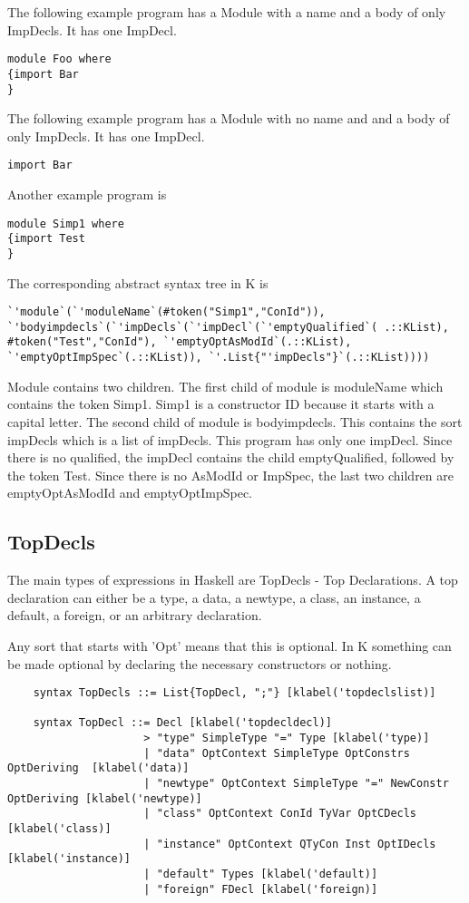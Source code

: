 The following example program has a Module with a name and a body of only ImpDecls. It has one ImpDecl.

\begin{lstlisting}
module Foo where
{import Bar
}
\end{lstlisting}

The following example program has a Module with no name and and a body of only ImpDecls. It has one ImpDecl.

\begin{lstlisting}
import Bar
\end{lstlisting}

Another example program is
\begin{lstlisting}
module Simp1 where
{import Test
}
\end{lstlisting}

The corresponding abstract syntax tree in K is
\begin{lstlisting}
`'module`(`'moduleName`(#token("Simp1","ConId")), `'bodyimpdecls`(`'impDecls`(`'impDecl`(`'emptyQualified`( .::KList), #token("Test","ConId"), `'emptyOptAsModId`(.::KList), `'emptyOptImpSpec`(.::KList)), `'.List{"'impDecls"}`(.::KList))))
\end{lstlisting}

Module contains two children. The first child of module is moduleName which contains the token Simp1. Simp1 is a constructor ID because it starts with a capital letter. The second child of module is bodyimpdecls. This contains the sort impDecls which is a list of impDecls. This program has only one impDecl. Since there is no qualified, the impDecl contains the child emptyQualified, followed by the token Test. Since there is no AsModId or ImpSpec, the last two children are emptyOptAsModId and emptyOptImpSpec.

\subsection{TopDecls}
The main types of expressions in Haskell are TopDecls - Top Declarations. A top declaration can either be a type, a data, a newtype, a class, an instance, a default, a foreign, or an arbitrary declaration.

Any sort that starts with 'Opt' means that this is optional. In K something can be made optional by declaring the necessary constructors or nothing.

\begin{lstlisting}
    syntax TopDecls ::= List{TopDecl, ";"} [klabel('topdeclslist)]

    syntax TopDecl ::= Decl [klabel('topdecldecl)]
                     > "type" SimpleType "=" Type [klabel('type)]
                     | "data" OptContext SimpleType OptConstrs OptDeriving  [klabel('data)]
                     | "newtype" OptContext SimpleType "=" NewConstr OptDeriving [klabel('newtype)]
                     | "class" OptContext ConId TyVar OptCDecls [klabel('class)]
                     | "instance" OptContext QTyCon Inst OptIDecls [klabel('instance)]
                     | "default" Types [klabel('default)]
                     | "foreign" FDecl [klabel('foreign)]
\end{lstlisting}

